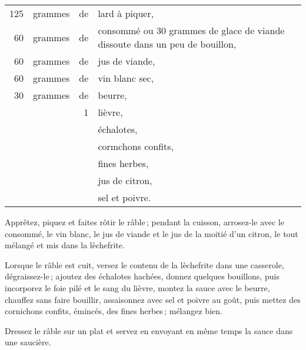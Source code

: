 \footnotesize
\begin{longtable}{rrrp{16em}}
    125 & grammes & de & lard à piquer,                                                                   \\
     60 & grammes & de & consommé ou 30 grammes de glace de viande dissoute dans un peu de bouillon,      \\
     60 & grammes & de & jus de viande,                                                                   \\
     60 & grammes & de & vin blanc sec,                                                                   \\
     30 & grammes & de & beurre,                                                                          \\
        &         &  1 & lièvre,                                                                          \\
        &         &    & échalotes,                                                                       \\
        &         &    & cormchons confits,                                                               \\
        &         &    & fines herbes,                                                                    \\
        &         &    & jus de citron,                                                                   \\
        &         &    & sel et poivre.                                                                   \\
\end{longtable}
\normalsize

Apprêtez, piquez et faites rôtir le râble ; pendant la cuisson, arrosez-le avec
le consommé, le vin blanc, le jus de viande et le jus de la moitié d'un citron,
le tout mélangé et mis dans la lèchefrite.

Lorsque le râble est cuit, versez le contenu de la lèchefrite dans une
casserole, dégraissez-le ; ajoutez des échalotes hachées, donnez quelques
bouillons, puis incorporez le foie pilé et le sang du lièvre, montez la sauce
avec le beurre, chauffez sans faire bouillir, assaisonnez avec sel et poivre au
goût, puis mettez des cornichons confits, émincés, des fines herbes ; mélangez
bien.

Dressez le râble sur un plat et servez en envoyant en même temps la sauce dans
une saucière.

